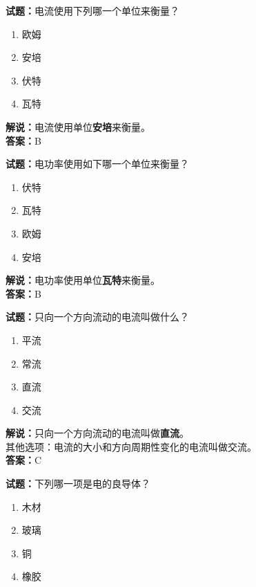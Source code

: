 \documentclass{ctexbook}
\begin{document}
\vspace{\baselineskip}

\noindent\textbf{试题：}电流使用下列哪一个单位来衡量？

\begin{enumerate}[leftmargin=3em]
  \item 欧姆
  \item 安培
  \item 伏特
  \item 瓦特
\end{enumerate}

\noindent\textbf{解说：}电流使用单位\textbf{安培}来衡量。\\
\noindent\textbf{答案：}B

\vspace{\baselineskip}

\noindent\textbf{试题：}电功率使用如下哪一个单位来衡量？

\begin{enumerate}[leftmargin=3em]
  \item 伏特
  \item 瓦特
  \item 欧姆
  \item 安培
\end{enumerate}

\noindent\textbf{解说：}电功率使用单位\textbf{瓦特}来衡量。\\
\noindent\textbf{答案：}B

\vspace{\baselineskip}

\noindent\textbf{试题：}只向一个方向流动的电流叫做什么？

\begin{enumerate}[leftmargin=3em]
  \item 平流
  \item 常流
  \item 直流
  \item 交流
\end{enumerate}

\noindent\textbf{解说：}只向一个方向流动的电流叫做\textbf{直流}。\\
其他选项：电流的大小和方向周期性变化的电流叫做交流。\\
\noindent\textbf{答案：}C

\vspace{\baselineskip}

\noindent\textbf{试题：}下列哪一项是电的良导体？

\begin{enumerate}[leftmargin=3em]
  \item 木材
  \item 玻璃
  \item 铜
  \item 橡胶
\end{enumerate}
\end{document}
